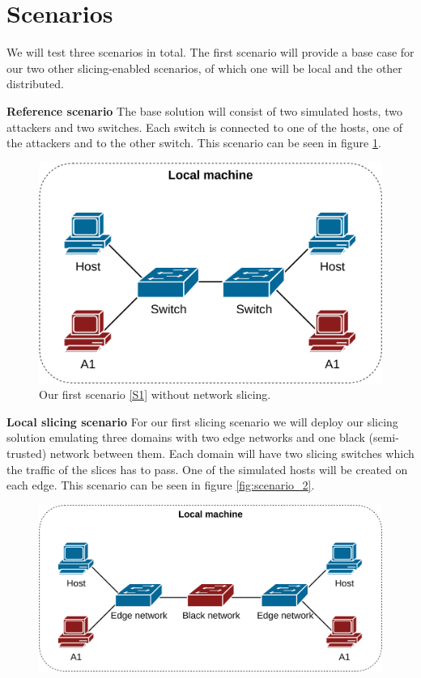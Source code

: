 \section{Scenarios}
\label{scenarios}
We will test three scenarios in total. The first scenario will provide a base case for our two other slicing-enabled scenarios, of which one will be local and the other distributed.

\begin{description}[style=multiline, labelwidth=0.7cm]
    \item[\namedlabel{S1}{S1}] \textbf{Reference scenario} The base solution will consist of two simulated hosts, two attackers and two switches. Each switch is connected to one of the hosts, one of the attackers and to the other switch. This scenario can be seen in figure \ref{fig:scenario_1}.
    \begin{figure}[ht]
        \centering
        \includegraphics[width=12cm]{images/chapter_4/scenario_1.png}
        \caption[Validation Scenario 1]{Our first scenario \ref{S1} without network slicing.}
        \label{fig:scenario_1}
    \end{figure}
    \item[\namedlabel{S2}{S2}] \textbf{Local slicing scenario} For our first slicing scenario we will deploy our slicing solution emulating three domains with two edge networks and one black (semi-trusted) network between them. Each domain will have two slicing switches which the traffic of the slices has to pass. One of the simulated hosts will be created on each edge. This scenario can be seen in figure \ref{fig:scenario_2}.
    \begin{figure}[ht]
        \centering
        \includegraphics[width=\textwidth]{images/chapter_4/scenario_2.png}

\end{figure}
\end{description}
